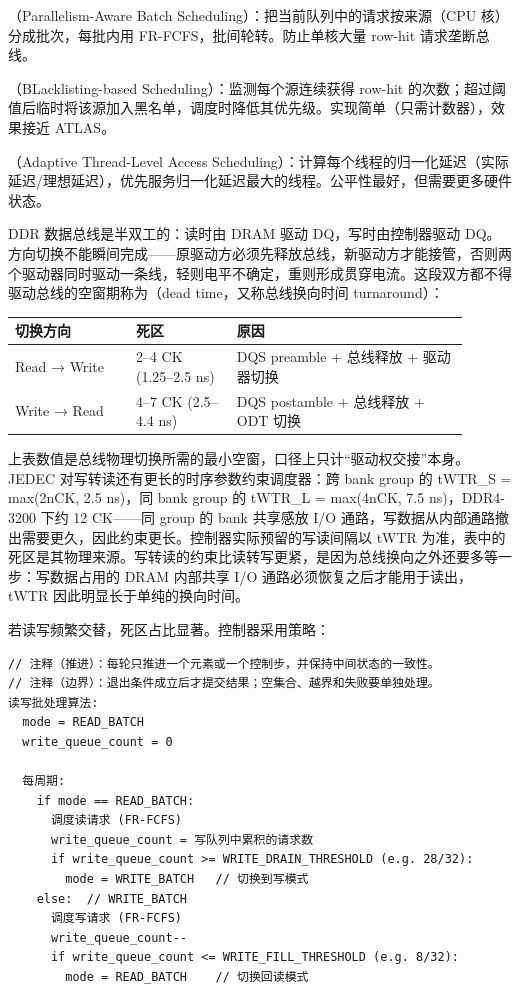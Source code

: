 （Parallelism-Aware Batch Scheduling）：把当前队列中的请求按来源（CPU 核）分成批次，每批内用 FR-FCFS，批间轮转。防止单核大量 row-hit 请求垄断总线。

（BLacklisting-based Scheduling）：监测每个源连续获得 row-hit 的次数；超过阈值后临时将该源加入黑名单，调度时降低其优先级。实现简单（只需计数器），效果接近 ATLAS。

（Adaptive Thread-Level Access Scheduling）：计算每个线程的归一化延迟（实际延迟/理想延迟），优先服务归一化延迟最大的线程。公平性最好，但需要更多硬件状态。


DDR 数据总线是半双工的：读时由 DRAM 驱动 DQ，写时由控制器驱动 DQ。方向切换不能瞬间完成——原驱动方必须先释放总线，新驱动方才能接管，否则两个驱动器同时驱动一条线，轻则电平不确定，重则形成贯穿电流。这段双方都不得驱动总线的空窗期称为（dead time，又称总线换向时间 turnaround）：

\begin{longtable}{L{0.24\linewidth}L{0.2\linewidth}L{0.46\linewidth}}
\toprule
切换方向 & 死区 & 原因 \\
\midrule
Read → Write & 2--4 CK (1.25--2.5 ns) & DQS preamble + 总线释放 + 驱动器切换 \\\tablerowrule
Write → Read & 4--7 CK (2.5--4.4 ns) & DQS postamble + 总线释放 + ODT 切换 \\
\bottomrule
\end{longtable}

上表数值是总线物理切换所需的最小空窗，口径上只计“驱动权交接”本身。JEDEC 对写转读还有更长的时序参数约束调度器：跨 bank group 的 tWTR\_S = max(2nCK, 2.5 ns)，同 bank group 的 tWTR\_L = max(4nCK, 7.5 ns)，DDR4-3200 下约 12 CK——同 group 的 bank 共享感放 I/O 通路，写数据从内部通路撤出需要更久，因此约束更长。控制器实际预留的写读间隔以 tWTR 为准，表中的死区是其物理来源。写转读的约束比读转写更紧，是因为总线换向之外还要多等一步：写数据占用的 DRAM 内部共享 I/O 通路必须恢复之后才能用于读出，tWTR 因此明显长于单纯的换向时间。

若读写频繁交替，死区占比显著。控制器采用策略：

\begin{lstlisting}
// 注释（推进）：每轮只推进一个元素或一个控制步，并保持中间状态的一致性。
// 注释（边界）：退出条件成立后才提交结果；空集合、越界和失败要单独处理。
读写批处理算法:
  mode = READ_BATCH
  write_queue_count = 0

  每周期:
    if mode == READ_BATCH:
      调度读请求 (FR-FCFS)
      write_queue_count = 写队列中累积的请求数
      if write_queue_count >= WRITE_DRAIN_THRESHOLD (e.g. 28/32):
        mode = WRITE_BATCH   // 切换到写模式
    else:  // WRITE_BATCH
      调度写请求 (FR-FCFS)
      write_queue_count--
      if write_queue_count <= WRITE_FILL_THRESHOLD (e.g. 8/32):
        mode = READ_BATCH    // 切换回读模式
\end{lstlisting}

